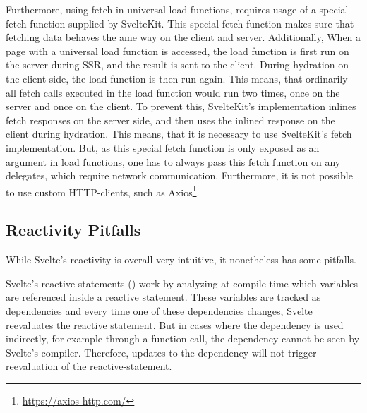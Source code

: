 
Furthermore, using fetch in universal load functions, requires usage of a special fetch function supplied by SvelteKit. This special fetch function makes sure that fetching data behaves the ame way on the client and server. Additionally, When a page with a universal load function is accessed, the load function is first run on the server during SSR, and the result is sent to the client. During hydration on the client side, the load function is then run again. This means, that ordinarily all fetch calls executed in the load function would run two times, once on the server and once on the client. To prevent this, SvelteKit's implementation inlines fetch responses on the server side, and then uses the inlined response on the client during hydration. This means, that it is necessary to use SvelteKit's fetch implementation. But, as this special fetch function is only exposed as an argument in load functions, one has to always pass this fetch function on any delegates, which require network communication. Furthermore, it is not possible to use custom HTTP-clients, such as Axios\footnote{\url{https://axios-http.com/}}.



\subsection{Reactivity Pitfalls}
\label{sec:evaluation-reactivity pitfalls}
While Svelte's reactivity is overall very intuitive, it nonetheless has some pitfalls.

Svelte's reactive statements () work by analyzing at compile time which variables are referenced inside a reactive statement. These variables are tracked as dependencies and every time one of these dependencies changes, Svelte reevaluates the reactive statement. But in cases where the dependency is used indirectly, for example through a function call, the dependency cannot be seen by Svelte's compiler. Therefore, updates to the dependency will not trigger reevaluation of the reactive-statement.

